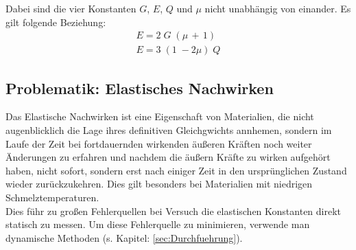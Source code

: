 Dabei sind die vier Konstanten $G$, $E$, $Q$ und $\mu$ nicht unabhängig von einander.
Es gilt folgende Beziehung:
\begin{gather}
    E = 2\;G\;(\mu\,+\,1) \\
    E = 3\;(1\;-2\mu)\;Q
\end{gather}


\subsection{Problematik: Elastisches Nachwirken}
Das Elastische Nachwirken ist eine Eigenschaft von Materialien, die nicht augenblicklich die Lage ihres definitiven 
Gleichgwichts annhemen, sondern im Laufe der Zeit bei fortdauernden wirkenden äußeren Kräften noch weiter Änderungen zu
erfahren und nachdem die äußern Kräfte zu wirken aufgehört haben, nicht sofort, sondern erst nach einiger Zeit in den 
ursprünglichen Zustand wieder zurückzukehren. %
Dies gilt besonders bei Materialien mit niedrigen Schmelztemperaturen.\\
Dies führ zu großen Fehlerquellen bei Versuch die elastischen Konstanten direkt statisch 
zu messen.\newline
Um diese Fehlerquelle zu minimieren, verwende man dynamische Methoden (s. Kapitel: \ref{sec:Durchfuehrung}).
\label{sec:nachwirken_vorb}


\label{sec:Theorie}
